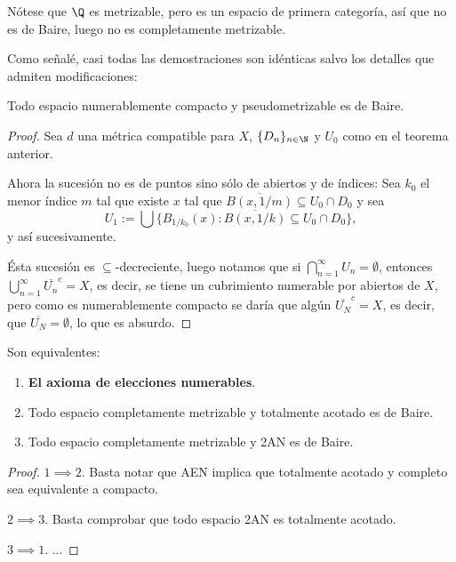 \documentclass[topologia-analisis.tex]{subfiles}
\begin{document}
\begin{ex}
	Nótese que $\Q$ es metrizable, pero es un espacio de primera categoría, así que no es de Baire, luego no es completamente metrizable.
\end{ex}

Como señalé, casi todas las demostraciones son idénticas salvo los detalles que admiten modificaciones:
\begin{thm}\label{thm:easy_baire}
	Todo espacio numerablemente compacto y pseudometrizable es de Baire.
\end{thm}
\begin{proof}
	Sea $d$ una métrica compatible para $X$, $\{D_n\}_{n\in\N}$ y $U_0$ como en el teorema anterior.

	Ahora la sucesión no es de puntos sino sólo de abiertos y de índices:
	Sea $k_0$ el menor índice $m$ tal que existe $x$ tal que $\overline{B(x, 1/m)} \subseteq U_0 \cap D_0$ y sea
	$$ U_1 := \bigcup \{ B_{1/k_0}(x) : \overline{B(x, 1/k)} \subseteq U_0\cap D_0 \}, $$
	y así sucesivamente.

	Ésta sucesión es $\subseteq$-decreciente, luego notamos que si $\bigcap_{n=1}^\infty U_n = \emptyset$, entonces
	$ \bigcup_{n=1}^\infty \overline{U_n}^c = X $, es decir, se tiene un cubrimiento numerable por abiertos de $X$,
	pero como es numerablemente compacto se daría que algún $\overline{U_N}^c = X$, es decir, que $\overline{U_N} = \emptyset$,
	lo que es absurdo.
\end{proof}

\begin{thm}
	Son equivalentes:
	\begin{enumerate}
		\item \textbf{El axioma de elecciones numerables}.
		\item Todo espacio completamente metrizable y totalmente acotado es de Baire.
		\item Todo espacio completamente metrizable y 2AN es de Baire.
	\end{enumerate}
\end{thm}
\begin{proof}
	$1\implies 2$. Basta notar que AEN implica que totalmente acotado y completo sea equivalente a compacto.

	$2\implies 3$. Basta comprobar que todo espacio 2AN es totalmente acotado.

	$3\implies 1$. ...
\end{proof}
\end{document}
